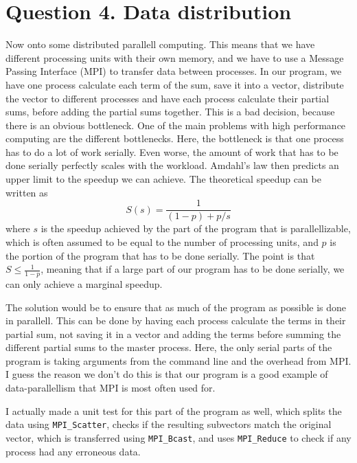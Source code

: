 \documentclass[12pt]{article}
\begin{document}
\section{Question 4. Data distribution}
Now onto some distributed parallell computing. This means that we have different processing units with their own memory, and we have to use a Message Passing Interface (MPI) to transfer
data between processes.
In our program, we have one process calculate each term of the sum, save it into a vector, distribute the vector to different processes and have each process calculate
their partial sums, before adding the partial sums together. This is a bad decision, because there is an obvious bottleneck. One of the main problems with high performance computing
are the different bottlenecks. Here, the bottleneck is that one process has to do a lot of work serially. Even worse, the amount of work that has to be done serially perfectly scales
with the workload. Amdahl's law then predicts an upper limit to the speedup we can achieve. The theoretical speedup can be written as
\begin{equation}
    S(s) = \frac{1}{(1-p) + p/s}
\end{equation}
where $s$ is the speedup achieved by the part of the program that is parallellizable, which is often assumed to be equal to the number of processing units, and $p$ is the portion of the 
program that has to be done serially. The point is that $S \le \frac{1}{1-p}$, meaning that if a large part of our program has to be done serially, we can only achieve a marginal speedup.

The solution would be to ensure that as much of the program as possible is done in parallell. This can be done by having each process calculate the terms in their partial sum, not saving it
in a vector and adding the terms before summing the different partial sums to the master process. Here, the only serial parts of the program is taking arguments from the command line
and the overhead from MPI. I guess the reason we don't do this is that our program is a good example of data-parallellism that MPI is most often used for.

I actually made a unit test for this part of the program as well, which splits the data using \texttt{MPI\_Scatter}, checks if the resulting subvectors match the original vector, 
which is transferred using \texttt{MPI\_Bcast}, and uses
\texttt{MPI\_Reduce} to check if any process had any erroneous data.
\end{document}
